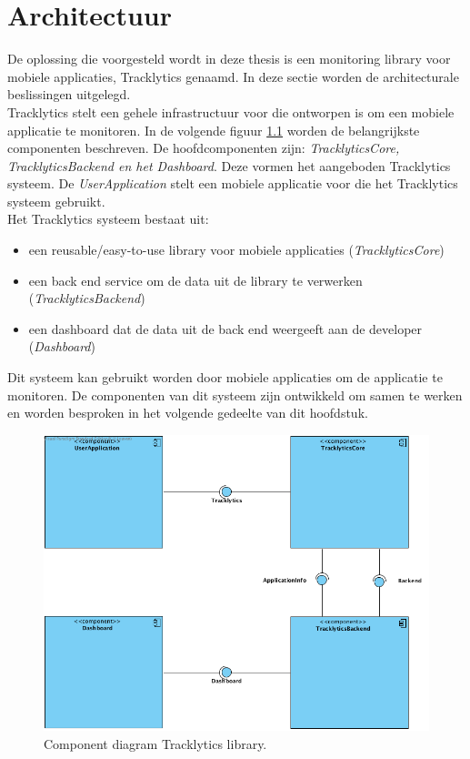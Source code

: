 \chapter{Architectuur}\label{architectuur}
De oplossing die voorgesteld wordt in deze thesis is een monitoring library voor mobiele applicaties, Tracklytics genaamd. In deze sectie worden de architecturale beslissingen uitgelegd.\\

Tracklytics stelt een gehele infrastructuur voor die ontworpen is om een mobiele applicatie te monitoren. In de volgende figuur \ref{fig:component} worden de belangrijkste componenten beschreven. De hoofdcomponenten zijn: \textit{TracklyticsCore, TracklyticsBackend en het Dashboard}. Deze vormen het aangeboden Tracklytics systeem. De \textit{UserApplication} stelt een mobiele applicatie voor die het Tracklytics systeem gebruikt. \\

Het Tracklytics systeem bestaat uit:
\begin{itemize}
\item een reusable/easy-to-use library voor mobiele applicaties (\textit{TracklyticsCore})
\item een back end service om de data uit de library te verwerken (\textit{TracklyticsBackend})
\item een dashboard dat de data uit de back end weergeeft aan de developer (\textit{Dashboard})
\end{itemize}

Dit systeem kan gebruikt worden door mobiele applicaties om de applicatie te monitoren. De componenten van dit systeem zijn ontwikkeld om samen te werken en worden besproken in het volgende gedeelte van dit hoofdstuk. 


\begin{figure}[!h]
  \centering
  \includegraphics[scale=0.4]{Afbeeldingen/Architectuur/Component}
  \caption{Component diagram Tracklytics library.}
  \label{fig:component}
\end{figure}

